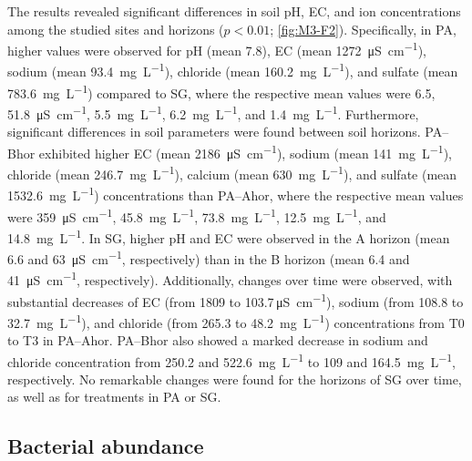 The results revealed significant differences in soil pH, EC, and ion concentrations among the studied sites and horizons (\(p < 0.01\); \ref{fig:M3-F2}). Specifically, in PA, higher values were observed for pH (mean 7.8), EC (mean \SI{1272}{\micro\siemens\per\centi\metre}), sodium (mean \SI{93.4}{\milli\gram\per\liter}), chloride (mean \SI{160.2}{\milli\gram\per\liter}), and sulfate (mean \SI{783.6}{\milli\gram\per\liter}) compared to SG, where the respective mean values were 6.5, \SI{51.8}{\micro\siemens\per\centi\metre}, \SI{5.5}{\milli\gram\per\liter}, \SI{6.2}{\milli\gram\per\liter}, and \SI{1.4}{\milli\gram\per\liter}. Furthermore, significant differences in soil parameters were found between soil horizons. PA--Bhor exhibited higher EC (mean \SI{2186}{\micro\siemens\per\centi\metre}), sodium (mean \SI{141}{\milli\gram\per\liter}), chloride (mean \SI{246.7}{\milli\gram\per\liter}), calcium (mean \SI{630}{\milli\gram\per\liter}), and sulfate (mean \SI{1532.6}{\milli\gram\per\liter}) concentrations than PA--Ahor, where the respective mean values were \SI{359}{\micro\siemens\per\centi\metre}, \SI{45.8}{\milli\gram\per\liter}, \SI{73.8}{\milli\gram\per\liter}, \SI{12.5}{\milli\gram\per\liter}, and \SI{14.8}{\milli\gram\per\liter}. In SG, higher pH and EC were observed in the A horizon (mean 6.6 and \SI{63}{\micro\siemens\per\centi\metre}, respectively) than in the B horizon (mean 6.4 and \SI{41}{\micro\siemens\per\centi\metre}, respectively). Additionally, changes over time were observed, with substantial decreases of EC (from \num{1809} to \num{103.7}\,\si{\micro\siemens\per\centi\metre}), sodium (from \num{108.8} to \SI{32.7}{\milli\gram\per\liter}), and chloride (from \num{265.3} to \SI{48.2}{\milli\gram\per\liter}) concentrations from T0 to T3 in PA--Ahor. PA--Bhor also showed a marked decrease in sodium and chloride concentration from \num{250.2} and \SI{522.6}{\milli\gram\per\liter} to \num{109} and \SI{164.5}{\milli\gram\per\liter}, respectively. 
No remarkable changes were found for the horizons of SG over time, as well as for treatments in PA or SG.

\subsection{Bacterial abundance}

